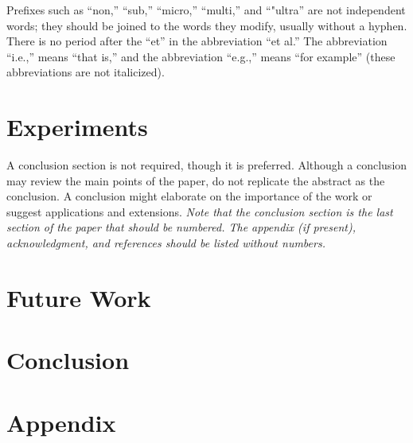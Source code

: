 \documentclass[conf]{new-aiaa}
\begin{document}
Prefixes such as ``non,'' ``sub,'' ``micro,'' ``multi,'' and ``"ultra'' are not independent words; they should be joined to the words they modify, usually without a hyphen. There is no period after the ``et'' in the abbreviation ``et al.'' The abbreviation ``i.e.,'' means ``that is,'' and the abbreviation ``e.g.,'' means ``for example'' (these abbreviations are not italicized).




\section{Experiments}
A conclusion section is not required, though it is preferred. Although a conclusion may review the main points of the paper, do not replicate the abstract as the conclusion. A conclusion might elaborate on the importance of the work or suggest applications and extensions. \textit{Note that the conclusion section is the last section of the paper that should be numbered. The appendix (if present), acknowledgment, and references should be listed without numbers.}



\section{Future Work}




\section{Conclusion}




\section*{Appendix}
\end{document}
